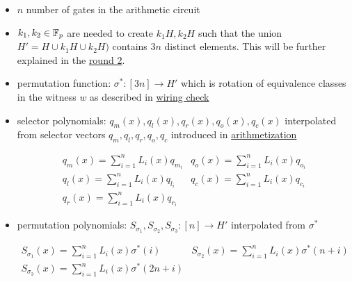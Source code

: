 \begin{itemize}
    \item $n$ number of gates in the arithmetic circuit
    \item $k_1, k_2 \in \mathbb{F}_p$ are needed to create $k_1 H , k_2 H$ such that the union $H' = H \cup k_1 H \cup k_2H)$ contains $3n$ distinct elements. This will be further explained in the \hyperref[chap:round2]{round 2}.
    \item permutation function: $\sigma^*: [3n] \rightarrow H'$ which is rotation of equivalence classes in the witness $w$ as described in \hyperref[sec:wiring-check]{wiring check}
    \item selector polynomials: $q_m(x), q_l(x), q_r(x), q_o(x), q_c(x)$ interpolated from selector vectors $q_m, q_l, q_r, q_o, q_c$ introduced in \hyperref[chap:arithmetization]{arithmetization}


    \begin{equation*}
        \begin{array}{cc}
        q_m(x) = \sum_{i=1}^n L_i(x) q_{m_i} & q_o(x) = \sum_{i=1}^n L_i(x) q_{o_i} \\
        q_l(x) = \sum_{i=1}^n L_i(x) q_{l_i} & q_c(x) = \sum_{i=1}^n L_i(x) q_{c_i} \\
        q_r(x) = \sum_{i=1}^n L_i(x) q_{r_i} 
        \end{array}
    \end{equation*}
        
    \item permutation polynomials: $S_{\sigma_1}, S_{\sigma_2}, S_{\sigma_3}: [n] \rightarrow H'$ interpolated from $\sigma^*$
    
    \begin{equation*}
        \begin{array}{cc}
        S_{\sigma_1}(x) = \sum_{i=1}^n L_i(x) \sigma^*(i) & S_{\sigma_2}(x) = \sum_{i=1}^n L_i(x) \sigma^*(n+i) \\
        S_{\sigma_3}(x) = \sum_{i=1}^n L_i(x) \sigma^*(2n+i)
        \end{array}
    \end{equation*}
\end{itemize}


